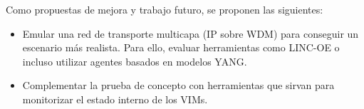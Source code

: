 Como propuestas de mejora y trabajo futuro, se proponen las siguientes:

\begin{itemize}
	
	\item Emular una red de transporte multicapa (\ac{IP} sobre \ac{WDM}) para conseguir un escenario más realista. Para ello, evaluar herramientas como LINC-OE\cite{lincoebib} o incluso utilizar agentes basados en modelos \ac{YANG}.
	
	\item Complementar la prueba de concepto con herramientas que sirvan para monitorizar el estado interno de los \acp{VIM}.
	
\end{itemize}

\cleardoublepage